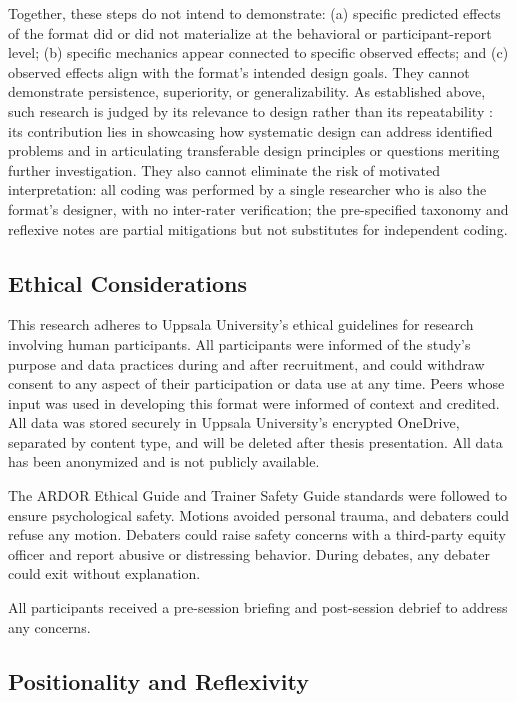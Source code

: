 Together, these steps do not intend to demonstrate: (a) specific predicted effects of the format did or did not materialize at the behavioral or participant-report level; (b) specific mechanics appear connected to specific observed effects; and (c) observed effects align with the format's intended design goals. They cannot demonstrate persistence, superiority, or generalizability. As established above, such research is judged by its relevance to design rather than its repeatability \parencite{zimmerman2007research}: its contribution lies in showcasing how systematic design can address identified problems and in articulating transferable design principles or questions meriting further investigation. They also cannot eliminate the risk of motivated interpretation: all coding was performed by a single researcher who is also the format's designer, with no inter-rater verification; the pre-specified taxonomy and reflexive notes are partial mitigations but not substitutes for independent coding.

\subsection{Ethical Considerations}

This research adheres to Uppsala University's ethical guidelines for research involving human participants. All participants were informed of the study's purpose and data practices during and after recruitment, and could withdraw consent to any aspect of their participation or data use at any time. Peers whose input was used in developing this format were informed of context and credited. All data was stored securely in Uppsala University's encrypted OneDrive, separated by content type, and will be deleted after thesis presentation. All data has been anonymized and is not publicly available.

The ARDOR Ethical Guide and Trainer Safety Guide standards were followed to ensure psychological safety. Motions avoided personal trauma, and debaters could refuse any motion. Debaters could raise safety concerns with a third-party equity officer and report abusive or distressing behavior. During debates, any debater could exit without explanation.

All participants received a pre-session briefing and post-session debrief to address any concerns.

\subsection{Positionality and Reflexivity}

